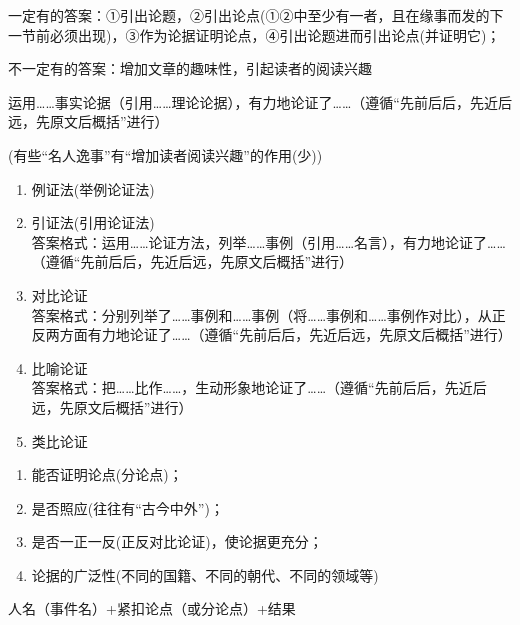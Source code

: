 一定有的答案：①引出论题，②引出论点(①②中至少有一者，且在缘事而发的下一节前必须出现)，③作为论据证明论点，④引出论题进而引出论点(并证明它)；

不一定有的答案：增加文章的趣味性，引起读者的阅读兴趣

运用\ldots{}\ldots{}事实论据（引用\ldots{}\ldots{}理论论据），有力地论证了\ldots{}\ldots{}（遵循``先前后后，先近后远，先原文后概括''进行）

(有些``名人逸事''有``增加读者阅读兴趣''的作用(少))

\begin{enumerate}
\item 例证法(举例论证法)
\item 引证法(引用论证法)\\
答案格式：运用\ldots{}\ldots{}论证方法，列举\ldots{}\ldots{}事例（引用\ldots{}\ldots{}名言），有力地论证了\ldots{}\ldots{}（遵循``先前后后，先近后远，先原文后概括''进行）
\item 对比论证\\
答案格式：分别列举了\ldots{}\ldots{}事例和\ldots{}\ldots{}事例（将\ldots{}\ldots{}事例和\ldots{}\ldots{}事例作对比），从正反两方面有力地论证了\ldots{}\ldots{}（遵循``先前后后，先近后远，先原文后概括''进行）
\item 比喻论证\\
答案格式：把\ldots{}\ldots{}比作\ldots{}\ldots{}，生动形象地论证了\ldots{}\ldots{}（遵循``先前后后，先近后远，先原文后概括''进行）
\item 类比论证
\end{enumerate}

\begin{enumerate}
\item 能否证明论点(分论点)；
\item 是否照应(往往有``古今中外'')；
\item 是否一正一反(正反对比论证)，使论据更充分；
\item 论据的广泛性(不同的国籍、不同的朝代、不同的领域等)
\end{enumerate}

人名（事件名）+紧扣论点（或分论点）+结果

